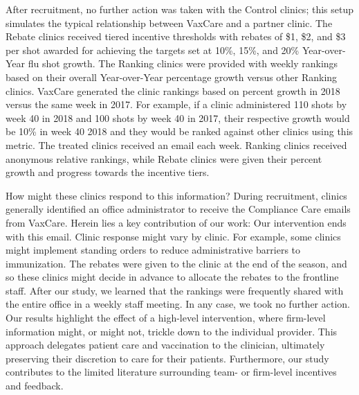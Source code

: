 \begin{onehalfspace}
 After recruitment, no further action was taken with the Control clinics; this setup simulates the typical relationship between VaxCare and a partner clinic. The Rebate clinics received tiered incentive thresholds with rebates of \$1, \$2, and \$3 per shot awarded for achieving the targets set at 10\%, 15\%, and 20\% Year-over-Year flu shot growth. The Ranking clinics were provided with weekly rankings based on their overall Year-over-Year percentage growth versus other Ranking clinics. VaxCare generated the clinic rankings based on percent growth in 2018 versus the same week in 2017. For example, if a clinic administered 110 shots by week 40 in 2018 and 100 shots by week 40 in 2017, their respective growth would be 10\% in week 40 2018 and they would be ranked against other clinics using this metric. The treated clinics received an email each week. Ranking clinics received anonymous relative rankings, while Rebate clinics were given their percent growth and progress towards the incentive tiers. 
 
 How might these clinics respond to this information? During recruitment, clinics generally identified an office administrator to receive the Compliance Care emails from VaxCare. Herein lies a key contribution of our work: Our intervention ends with this email. Clinic response might vary by clinic. For example, some clinics might implement standing orders to reduce administrative barriers to immunization. The rebates were given to the clinic at the end of the season, and so these clinics might decide in advance to allocate the rebates to the frontline staff. After our study, we learned that the rankings were frequently shared with the entire office in a weekly staff meeting. In any case, we took no further action. Our results highlight the effect of a high-level intervention, where firm-level information might, or might not, trickle down to the individual provider. This approach delegates patient care and vaccination to the clinician, ultimately preserving their discretion to care for their patients. Furthermore, our study contributes to the limited literature surrounding team- or firm-level incentives and feedback. 
 

\end{onehalfspace}
